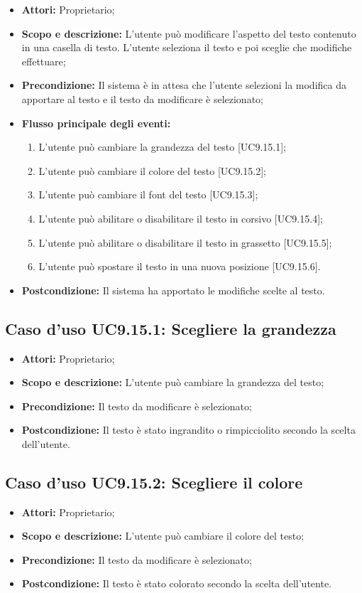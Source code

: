 \begin{itemize}
	\item \textbf{Attori:} Proprietario;
	\item \textbf{Scopo e descrizione:} L'utente può modificare l'aspetto del testo contenuto in una casella di testo. L'utente seleziona il testo e poi sceglie che modifiche effettuare;
	\item \textbf{Precondizione:} Il sistema è in attesa che l'utente selezioni la modifica da apportare al testo e il testo da modificare è selezionato;
	\item \textbf{Flusso principale degli eventi:}
	\begin{enumerate}
		\item L'utente può cambiare la grandezza del testo [UC9.15.1];
		\item L'utente può cambiare il colore del testo [UC9.15.2];
		\item L'utente può cambiare il font del testo [UC9.15.3];
		\item L'utente può abilitare o disabilitare il testo in corsivo [UC9.15.4];
		\item L'utente può abilitare o disabilitare il testo in grassetto [UC9.15.5];
		\item L'utente può spostare il testo in una nuova posizione [UC9.15.6].
	\end{enumerate}
	\item \textbf{Postcondizione:} Il sistema ha apportato le modifiche scelte al testo.
\end{itemize}

\subsection{Caso d'uso UC9.15.1: Scegliere la grandezza}
\begin{itemize}
	\item \textbf{Attori:} Proprietario;
	\item \textbf{Scopo e descrizione:} L'utente può cambiare la grandezza del testo;
	\item \textbf{Precondizione:} Il testo da modificare è selezionato;
	\item \textbf{Postcondizione:} Il testo è stato ingrandito o rimpicciolito secondo la scelta dell'utente.
\end{itemize}

\subsection{Caso d'uso UC9.15.2: Scegliere il colore}
\begin{itemize}
	\item \textbf{Attori:} Proprietario;
	\item \textbf{Scopo e descrizione:} L'utente può cambiare il colore del testo;
	\item \textbf{Precondizione:} Il testo da modificare è selezionato;
	\item \textbf{Postcondizione:} Il testo è stato colorato secondo la scelta dell'utente.
\end{itemize}

